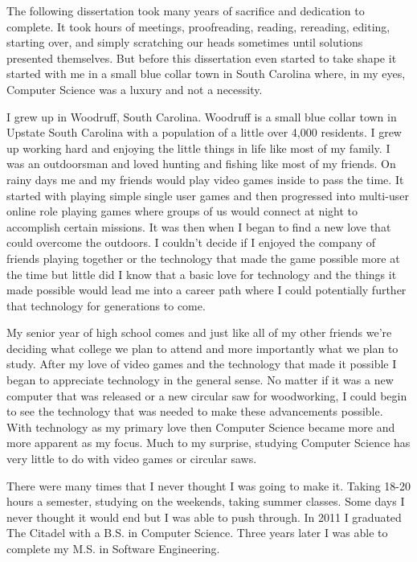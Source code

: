 The following dissertation took many years of sacrifice and dedication to complete. It took hours of meetings, proofreading, reading, rereading, editing, starting over, and simply scratching our heads sometimes until solutions presented themselves. But before this dissertation even started to take shape it started with me in a small blue collar town in South Carolina where, in my eyes, Computer Science was a luxury and not a necessity. 

I grew up in Woodruff, South Carolina. Woodruff is a small blue collar town in Upstate South Carolina with a population of a little over 4,000 residents. I grew up working hard and enjoying the little things in life like most of my family. I was an outdoorsman and loved hunting and fishing like most of my friends. On rainy days me and my friends would play video games inside to pass the time. It started with playing simple single user games and then progressed into multi-user online role playing games where groups of us would connect at night to accomplish certain missions. It was then when I began to find a new love that could overcome the outdoors. I couldn't decide if I enjoyed the company of friends playing together or the technology that made the game possible more at the time but little did I know that a basic love for technology and the things it made possible would lead me into a career path where I could potentially further that technology for generations to come.

My senior year of high school comes and just like all of my other friends we're deciding what college we plan to attend and more importantly what we plan to study. After my love of video games and the technology that made it possible I began to appreciate technology in the general sense. No matter if it was a new computer that was released or a new circular saw for woodworking, I could begin to see the technology that was needed to make these advancements possible. With technology as my primary love then Computer Science became more and more apparent as my focus. Much to my surprise, studying Computer Science has very little to do with video games or circular saws. 

There were many times that I never thought I was going to make it. Taking 18-20 hours a semester, studying on the weekends, taking summer classes. Some days I never thought it would end but I was able to push through. In 2011 I graduated The Citadel with a B.S. in Computer Science. Three years later I was able to complete my M.S. in Software Engineering.

